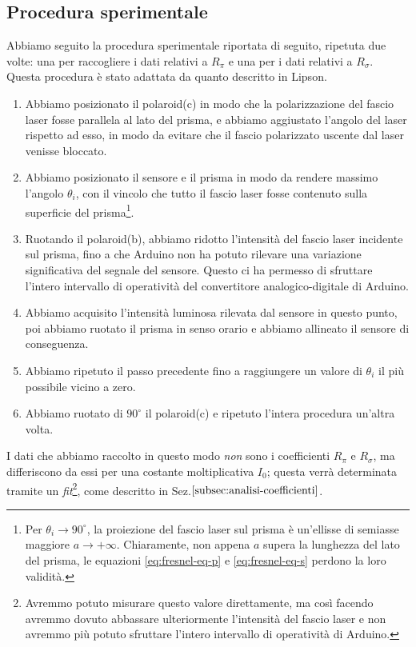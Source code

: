 \subsection{Procedura sperimentale}\label{subsec:procedura-sperimentale}
  Abbiamo seguito la procedura sperimentale riportata di seguito, ripetuta due
  volte: una per raccogliere i dati relativi a $R_\pi$ e una per i dati relativi
  a $R_\sigma$. Questa procedura è stato adattata da quanto descritto in Lipson\cite{lipson20}.
  \begin{enumerate}
    \item%
      Abbiamo posizionato il polaroid(c) in modo che la polarizzazione del
      fascio laser fosse parallela al lato del prisma, e abbiamo aggiustato l'angolo
      del laser rispetto ad esso, in modo da evitare che il fascio
      polarizzato uscente dal laser venisse bloccato.
    \item%
      Abbiamo posizionato il sensore e il prisma in modo da rendere
      massimo l'angolo $\theta_i$, con il vincolo che
      tutto il fascio laser fosse contenuto sulla superficie del prisma\footnote{Per $\theta_i \to 90^\circ$, la
      proiezione del fascio laser sul prisma è un'ellisse di semiasse maggiore $a \to +\infty$. Chiaramente, non appena
      $a$ supera la lunghezza del lato del prisma, le equazioni \eqref{eq:fresnel-eq-p} e \eqref{eq:fresnel-eq-s} perdono
      la loro validità.}.
    \item%
      Ruotando il polaroid(b), abbiamo ridotto l’intensità del fascio laser
      incidente sul prisma, fino a che Arduino non ha potuto rilevare una
      variazione significativa del segnale del sensore.
      Questo ci ha permesso di sfruttare l'intero intervallo di operatività del convertitore analogico-digitale di Arduino.
    \item%
      Abbiamo acquisito l'intensità luminosa rilevata dal sensore in questo punto,
      poi abbiamo ruotato il prisma in senso orario e abbiamo
      allineato il sensore di conseguenza.
    \item%
      Abbiamo ripetuto il passo precedente fino a raggiungere un valore di $\theta_i$
      il più possibile vicino a zero.
    \item%
      Abbiamo ruotato di $90^\circ$ il polaroid(c) e ripetuto l'intera
      procedura un'altra volta.
  \end{enumerate}
  I dati che abbiamo raccolto in questo modo \emph{non} sono
  i coefficienti $R_\pi$ e $R_\sigma$, ma differiscono da essi per una costante
  moltiplicativa $I_0$; questa verrà determinata tramite un \emph{fit}\footnote{Avremmo potuto misurare
  questo valore direttamente, ma così facendo avremmo dovuto
  abbassare ulteriormente l'intensità del fascio laser e non avremmo più potuto
  sfruttare l'intero intervallo di operatività di Arduino.}, come descritto in Sez.$\ref{subsec:analisi-coefficienti}$.
\endinput

